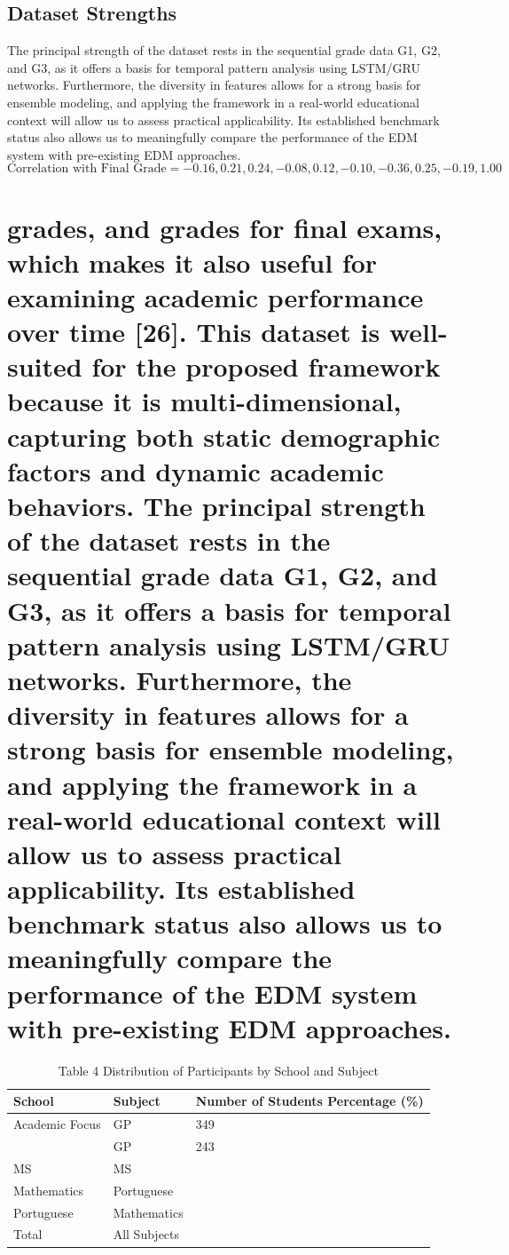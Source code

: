 \documentclass[twocolumn]{svjour3}
\begin{document}
\subsection{Dataset Strengths}
The principal strength of the dataset rests in the sequential grade data G1, G2, and G3, as it offers a basis for temporal pattern analysis using LSTM/GRU networks. Furthermore, the diversity in features allows for a strong basis for ensemble modeling, and applying the framework in a real-world educational context will allow us to assess practical applicability. Its established benchmark status also allows us to meaningfully compare the performance of the EDM system with pre-existing EDM approaches.
\begin{equation}
\text{Correlation with Final Grade} = -0.16, 0.21, 0.24, -0.08, 0.12, -0.10, -0.36, 0.25, -0.19, 1.00
\end{equation}

\section{grades, and grades for final exams, which makes it also useful for examining academic performance over time [26]. This dataset is well-suited for the proposed framework because it is multi-dimensional, capturing both static demographic factors and dynamic academic behaviors. The principal strength of the dataset rests in the sequential grade data G1, G2, and G3, as it offers a basis for temporal pattern analysis using LSTM/GRU networks. Furthermore, the diversity in features allows for a strong basis for ensemble modeling, and applying the framework in a real-world educational context will allow us to assess practical applicability. Its established benchmark status also allows us to meaningfully compare the performance of the EDM system with pre-existing EDM approaches.}
\begin{table}
\centering
\caption{Table 4 Distribution of Participants by School and Subject}
\begin{tabular}{lll}
\hline
School & Subject & Number of Students Percentage (\%) \\
\hline
Academic Focus & GP & 349 \\
& GP & 243 \\
MS & MS & \\
Mathematics & Portuguese & \\
Portuguese & Mathematics & \\
Total & All Subjects & \\
\hline
\end{tabular}
\end{table}
\end{document}
